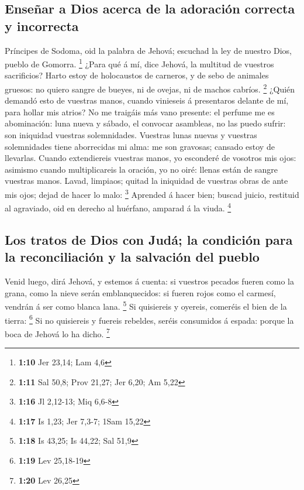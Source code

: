 \hypertarget{enseuxf1ar-a-dios-acerca-de-la-adoraciuxf3n-correcta-y-incorrecta}{%
\subsection{Enseñar a Dios acerca de la adoración correcta y
incorrecta}\label{enseuxf1ar-a-dios-acerca-de-la-adoraciuxf3n-correcta-y-incorrecta}}

 Príncipes de Sodoma, oid la palabra de Jehová; escuchad la
ley de nuestro Dios, pueblo de Gomorra. \footnote{\textbf{1:10} Jer
  23,14; Lam 4,6}  ¿Para qué á mí, dice Jehová, la multitud
de vuestros sacrificios? Harto estoy de holocaustos de carneros, y de
sebo de animales gruesos: no quiero sangre de bueyes, ni de ovejas, ni
de machos cabríos. \footnote{\textbf{1:11} Sal 50,8; Prov 21,27; Jer
  6,20; Am 5,22}  ¿Quién demandó esto de vuestras manos,
cuando vinieseis á presentaros delante de mí, para hollar mis atrios?
 No me traigáis más vano presente: el perfume me es
abominación: luna nueva y sábado, el convocar asambleas, no las puedo
sufrir: son iniquidad vuestras solemnidades.  Vuestras
lunas nuevas y vuestras solemnidades tiene aborrecidas mi alma: me son
gravosas; cansado estoy de llevarlas.  Cuando extendiereis
vuestras manos, yo esconderé de vosotros mis ojos: asimismo cuando
multiplicareis la oración, yo no oiré: llenas están de sangre vuestras
manos.  Lavad, limpiaos; quitad la iniquidad de vuestras
obras de ante mis ojos; dejad de hacer lo malo: \footnote{\textbf{1:16}
  Jl 2,12-13; Miq 6,6-8}  Aprended á hacer bien; buscad
juicio, restituid al agraviado, oid en derecho al huérfano, amparad á la
viuda. \footnote{\textbf{1:17} Is 1,23; Jer 7,3-7; 1Sam 15,22}

\hypertarget{los-tratos-de-dios-con-juduxe1-la-condiciuxf3n-para-la-reconciliaciuxf3n-y-la-salvaciuxf3n-del-pueblo}{%
\subsection{Los tratos de Dios con Judá; la condición para la
reconciliación y la salvación del
pueblo}\label{los-tratos-de-dios-con-juduxe1-la-condiciuxf3n-para-la-reconciliaciuxf3n-y-la-salvaciuxf3n-del-pueblo}}

 Venid luego, dirá Jehová, y estemos á cuenta: si vuestros
pecados fueren como la grana, como la nieve serán emblanquecidos: si
fueren rojos como el carmesí, vendrán á ser como blanca lana.
\footnote{\textbf{1:18} Is 43,25; Is 44,22; Sal 51,9}  Si
quisiereis y oyereis, comeréis el bien de la tierra: \footnote{\textbf{1:19}
  Lev 25,18-19}  Si no quisiereis y fuereis rebeldes,
seréis consumidos á espada: porque la boca de Jehová lo ha dicho.
\footnote{\textbf{1:20} Lev 26,25}


